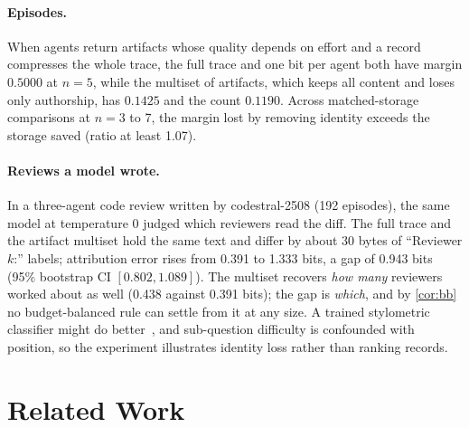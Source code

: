 \documentclass[sigconf,anonymous,acmthm=false]{aamas}
\theoremstyle{acmplain}
\theoremstyle{acmdefinition}
\begin{document}
\paragraph{Episodes.} When agents return artifacts whose quality depends on effort and a record
compresses the whole trace, the full trace and one bit per agent both have margin $0.5000$ at
$n=5$, while the multiset of artifacts, which keeps all content and loses only authorship,
has $0.1425$ and the count $0.1190$. Across matched-storage comparisons at $n=3$ to 7, the
margin lost by removing identity exceeds the storage saved (ratio at least 1.07).

\paragraph{Reviews a model wrote.} In a three-agent code review written by codestral-2508 (192
episodes), the same model at temperature 0 judged which reviewers read the diff. The full
trace and the artifact multiset hold the same text and differ by about 30 bytes of
``Reviewer $k$:'' labels; attribution error rises from 0.391 to 1.333 bits, a gap of 0.943 bits
(95\% bootstrap CI $[0.802,1.089]$). The multiset recovers \emph{how many} reviewers worked
about as well (0.438 against 0.391 bits); the gap is \emph{which}, and by \cref{cor:bb} no
budget-balanced rule can settle from it at any size. A trained stylometric
classifier might do better~\cite{dietrich2026peers}, and sub-question difficulty is confounded
with position, so the experiment illustrates identity loss rather than ranking records.

\section{Related Work}\label{sec:related}
\end{document}
